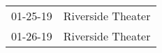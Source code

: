 \begin{supertabular}{p{0.25\columnwidth}p{0.75\columnwidth}}
 01-25-19 &  Riverside Theater \\
 01-26-19 &  Riverside Theater \\
\end{supertabular}

